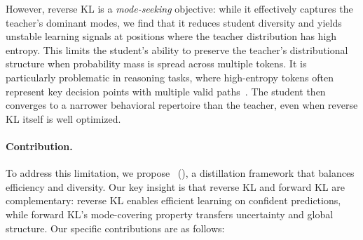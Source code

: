 



However, reverse KL is a \textit{mode-seeking} objective: while it effectively captures the teacher's dominant modes, we find that it reduces student diversity and yields unstable learning signals at positions where the teacher distribution has high entropy. This limits the student's ability to preserve the teacher's distributional structure when probability mass is spread across multiple tokens. It is particularly problematic in reasoning tasks, where high-entropy tokens often represent key decision points with multiple valid paths~\cite{wang2025beyond, cheng2025reasoning}. The student then converges to a narrower behavioral repertoire than the teacher, even when reverse KL itself is well optimized.
\vspace{-8pt}
\paragraph{Contribution.}
To address this limitation, we propose \methodfullname~(\method), a distillation framework that balances efficiency and diversity. Our key insight is that reverse KL and forward KL are complementary: reverse KL enables efficient learning on confident predictions, while forward KL's mode-covering property transfers uncertainty and global structure. Our specific contributions are as follows:

